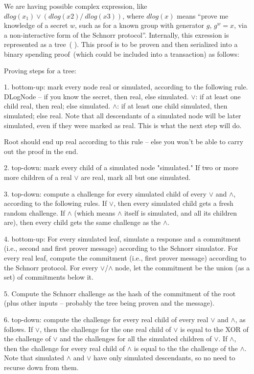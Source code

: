 \documentclass[]{article}   %
\newcommand{\authnote}[2]{\marginpar{\parbox{\marginparwidth}{\tiny %
  \textsf{#1 {\textcolor{blue}{notes: #2}}}}}%
  \textcolor{blue}{\textbf{\dag}}}
\newcommand{\authnote}[2]{
  \textsf{#1 \textcolor{blue}{: #2}}}
\newcommand{\authnote}[2]{}
\newcommand{\knote}[1]{{\authnote{\textcolor{green}{Alex notes}}{#1}}}
\begin{document}
We are having possible complex expression, like $dlog(x_1) \lor (dlog(x2) /\ dlog(x3))$, where $dlog(x)$ means ``prove me
knowledge of a secret $w$, such as for a known group with generator $g$, $g^w = x$, via a non-interactive form of the
Schnorr protocol''. Internally, this exression is represented as a tree~(\knote{draw the tree}). This proof is to be
proven and then serialized into a binary spending proof~(which could be included into a transaction) as follows:

Proving steps for a tree:

\knote{text below is duplicated in Sigma paper, also this is a raw text copypasted from an email}


    1. bottom-up: mark every node real or simulated, according to the following rule. DLogNode -- if you know the secret,
     then real, else simulated. $\lor$: if at least one child real, then real; else simulated. $\land$: if at least one child
     simulated, then simulated; else real. Note that all descendants of a simulated node will be later simulated, even
     if they were marked as real. This is what the next step will do.

     Root should end up real according to this rule -- else you won't be able to carry out the proof in the end.

    2. top-down: mark every child of a simulated node "simulated." If two or more more children of a real $\lor$ are real,
     mark all but one simulated.

    3. top-down: compute a challenge for every simulated child of every $\lor$ and $\land$, according to the following rules.
     If $\lor$, then every simulated child gets a fresh random challenge. If $\land$ (which means $\land$ itself is simulated, and
     all its children are), then every child gets the same challenge as the $\land$.

    4. bottom-up: For every simulated leaf, simulate a response and a commitment (i.e., second and first prover message)
     according to the Schnorr simulator. For every real leaf, compute the commitment (i.e., first prover message) according
     to the Schnorr protocol. For every $\lor$/$\land$ node, let the commitment be the union (as a set) of commitments below it.

    5. Compute the Schnorr challenge as the hash of the commitment of the root (plus other inputs -- probably the tree
     being proven and the message).

    6. top-down: compute the challenge for every real child of every real $\lor$ and $\land$, as follows. If $\lor$, then the
     challenge for the one real child of $\lor$ is equal to the XOR of the challenge of $\lor$ and the challenges for all the
     simulated children of $\lor$. If $\land$, then the challenge for every real child of $\land$ is equal to the the challenge of
     the $\land$. Note that simulated $\land$ and $\lor$ have only simulated descendants, so no need to recurse down from them.
\end{document}
